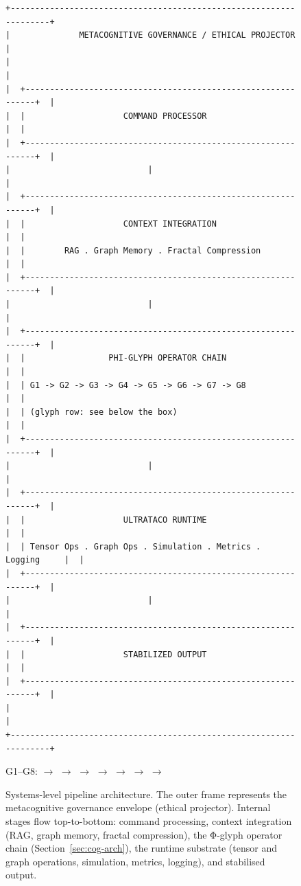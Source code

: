\documentclass[12pt]{article}
\newcommand{\alch}[1]{\text{\alchfont #1}}     %
\newcommand{\mglyph}[1]{\text{\mglyphfont #1}} %
\begin{document}
\begin{figure}[htbp]
\small
\begin{verbatim}
+-------------------------------------------------------------------+
|              METACOGNITIVE GOVERNANCE / ETHICAL PROJECTOR         |
|                                                                   |
|  +-------------------------------------------------------------+  |
|  |                    COMMAND PROCESSOR                        |  |
|  +-------------------------------------------------------------+  |
|                            |                                      |
|  +-------------------------------------------------------------+  |
|  |                    CONTEXT INTEGRATION                      |  |
|  |        RAG . Graph Memory . Fractal Compression             |  |
|  +-------------------------------------------------------------+  |
|                            |                                      |
|  +-------------------------------------------------------------+  |
|  |                 PHI-GLYPH OPERATOR CHAIN                    |  |
|  | G1 -> G2 -> G3 -> G4 -> G5 -> G6 -> G7 -> G8                |  |
|  | (glyph row: see below the box)                              |  |
|  +-------------------------------------------------------------+  |
|                            |                                      |
|  +-------------------------------------------------------------+  |
|  |                    ULTRATACO RUNTIME                        |  |
|  | Tensor Ops . Graph Ops . Simulation . Metrics . Logging     |  |
|  +-------------------------------------------------------------+  |
|                            |                                      |
|  +-------------------------------------------------------------+  |
|  |                    STABILIZED OUTPUT                        |  |
|  +-------------------------------------------------------------+  |
|                                                                   |
+-------------------------------------------------------------------+
\end{verbatim}
\begin{center}
\small G1--G8:\quad \alch{🜂} $\to$ \alch{🜄} $\to$ \alch{🝞} $\to$ \mglyph{⟠} $\to$ \mglyph{⦾} $\to$ \alch{🜿} $\to$ \alch{🝏} $\to$ \alch{🝪}
\end{center}
\caption{Systems-level pipeline architecture. The outer frame represents the metacognitive governance envelope (ethical projector). Internal stages flow top-to-bottom: command processing, context integration (RAG, graph memory, fractal compression), the Φ-glyph operator chain (Section~\ref{sec:cog-arch}), the runtime substrate (tensor and graph operations, simulation, metrics, logging), and stabilised output.}
\label{fig:pipeline-arch}
\end{figure}
\end{document}
